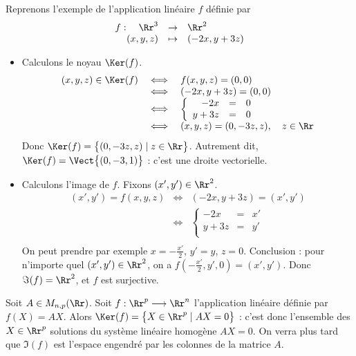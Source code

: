 \documentclass[class=report,crop=false]{standalone}
\begin{document}
\begin{exemple}
Reprenons l'exemple de l'application linéaire
$f$ définie par
$$\begin{array}{rcl}
f : \quad \Rr^3 & \to & \Rr^2\\
(x,y,z) & \mapsto & (-2x,y+3z)
 \end{array}$$
\begin{itemize}
  \item Calculons le noyau $\Ker(f)$.
$$
\begin{array}{rcl}
(x,y,z) \in \Ker(f)
 & \iff & f(x,y,z)=(0,0) \\
 & \iff & (-2x,y+3z)=(0,0) \\
 & \iff & \left\{\begin{array}{rcl}
             -2x  & = & 0 \\
             y+3z & = & 0 \\
          \end{array}\right. \\
 & \iff & (x,y,z) = (0,-3z,z), \quad z \in \Rr \\
\end{array}
$$
Donc $\Ker(f) = \big\{ (0,-3z,z) \mid  z \in \Rr \big\}$.
Autrement dit, $\Ker(f) = \Vect\big\{ (0,-3,1) \big\}$ : c'est une droite vectorielle.

  \item Calculons l'image de $f$.
  Fixons $(x',y')\in \Rr^2$.
$$
\begin{array}{rcl}
(x',y')= f(x,y,z)
 & \iff & (-2x,y+3z)=(x',y') \\
 & \iff & \left\{\begin{array}{rcl}
             -2x  & = & x' \\
             y+3z & = & y' \\
          \end{array}\right. \\
\end{array}
$$
On peut prendre par exemple $x = -\frac{x'}{2}$, $y'=y$, $z=0$.
Conclusion : pour n'importe quel $(x',y') \in \Rr^2$, on a
$f(-\frac{x'}{2},y',0) = (x',y')$.
Donc $\Im(f)= \Rr^2$, et $f$ est surjective.
\end{itemize}
\end{exemple}


\begin{exemple}
Soit $A \in M_{n,p}(\Rr)$.
Soit $f: \Rr^p \longrightarrow \Rr^n$ l'application linéaire définie par $f(X) = AX$.
Alors $\Ker(f) = \big\{ X \in \Rr^p \mid AX=0 \big\}$ : c'est donc l'ensemble des $X \in \Rr^p$
solutions du système linéaire homogène $AX=0$.
On verra plus tard que $\Im(f)$ est l'espace engendré
par les colonnes de la matrice $A$.
\end{exemple}
\end{document}

